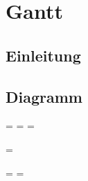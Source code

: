 \chapter{Gantt}

\section{Einleitung}

\section{Diagramm}

\newpage

\paperwidth=\pdfpageheight
{}\pdfpagewidth
\pdfpageheight=\paperheight
\pdfpagewidth=\paperwidth
{}\textheight

\begingroup 
\vsize=\textwidth
{}\textheight

\textwidth=\hsize
\textheight=\vsize



